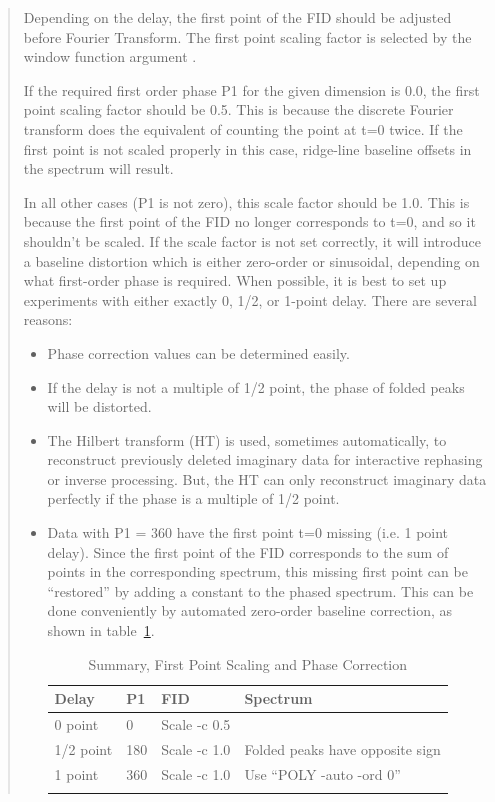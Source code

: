 \begin{quotation}
Depending on the delay, the first point of the FID should be adjusted before Fourier Transform.  The first point scaling factor is selected by the window function argument .

If the required first order phase P1 for the given dimension is 0.0, the first point scaling factor should be 0.5.  This is because the discrete Fourier transform does the equivalent of counting the point at t=0 twice.  If the first point is not scaled properly in this case, ridge-line baseline offsets in the spectrum will result.

In all other cases (P1 is not zero), this scale factor should be 1.0. This is because the first point of the FID no longer corresponds to t=0, and so it shouldn't be scaled. If the scale factor is not set correctly, it will introduce a baseline distortion which is either zero-order or sinusoidal, depending on what first-order phase is required. When possible, it is best to set up experiments with either exactly 0, 1/2, or 1-point delay.  There are several reasons:

\begin{itemize}
\item Phase correction values can be determined easily.
\item If the delay is not a multiple of 1/2 point, the phase of folded peaks will be distorted.
\item The Hilbert transform (HT) is used, sometimes automatically, to reconstruct previously deleted imaginary data for interactive rephasing or inverse processing. But, the HT can only reconstruct imaginary data perfectly if the phase is a multiple of 1/2 point.
\item Data with P1 = 360 have the first point t=0 missing (i.e. 1 point delay). Since the first point of the FID corresponds to the sum of points in the corresponding spectrum, this missing first point can be ``restored'' by adding a constant to the phased spectrum.  This can be done conveniently by automated zero-order baseline correction, as shown in table~\ref{table: NMRPipe -c}.

\begin{table}
\begin{center}
\caption{Summary, First Point Scaling and Phase Correction}
\begin{tabular}{llll}
\toprule
Delay & P1 & FID & Spectrum\\
\midrule
0   point &   0 & Scale -c 0.5 \\
1/2 point & 180 & Scale -c 1.0 & Folded peaks have opposite sign \\
1   point & 360 & Scale -c 1.0 & Use ``POLY -auto -ord 0'' \\
\bottomrule
\label{table: NMRPipe -c}
\end{tabular}
\end{center}
\end{table}

\end{itemize}
\end{quotation}


